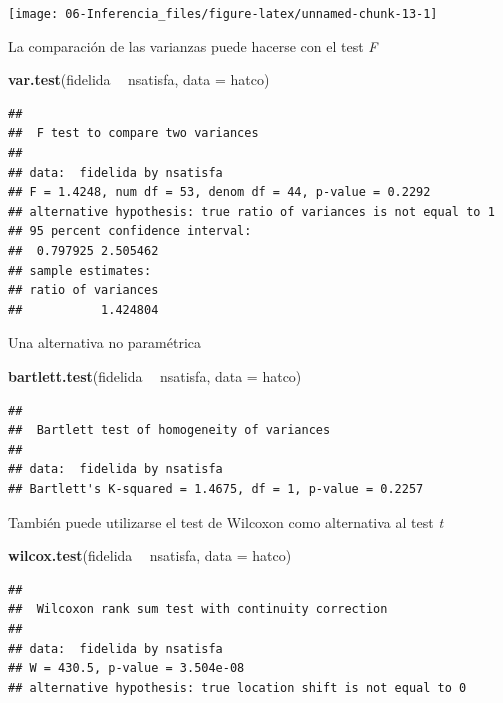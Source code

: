 \documentclass[]{book}
\newenvironment{Shaded}{\begin{snugshade}}{\end{snugshade}}
\newcommand{\DataTypeTok}[1]{\textcolor[rgb]{0.13,0.29,0.53}{#1}}
\newcommand{\KeywordTok}[1]{\textcolor[rgb]{0.13,0.29,0.53}{\textbf{#1}}}
\newcommand{\NormalTok}[1]{#1}
\newcommand{\OperatorTok}[1]{\textcolor[rgb]{0.81,0.36,0.00}{\textbf{#1}}}
\newcommand{\StringTok}[1]{\textcolor[rgb]{0.31,0.60,0.02}{#1}}
\begin{document}
\begin{center}\texttt{[image: 06-Inferencia\_files/figure-latex/unnamed-chunk-13-1]} \end{center}

La comparación de las varianzas puede hacerse con el test \emph{F}

\begin{Shaded}
\begin{Highlighting}[]
\KeywordTok{var.test}\NormalTok{(fidelida }\OperatorTok{~}\StringTok{ }\NormalTok{nsatisfa, }\DataTypeTok{data =}\NormalTok{ hatco)}
\end{Highlighting}
\end{Shaded}

\begin{verbatim}
## 
##  F test to compare two variances
## 
## data:  fidelida by nsatisfa
## F = 1.4248, num df = 53, denom df = 44, p-value = 0.2292
## alternative hypothesis: true ratio of variances is not equal to 1
## 95 percent confidence interval:
##  0.797925 2.505462
## sample estimates:
## ratio of variances 
##           1.424804
\end{verbatim}

Una alternativa no paramétrica

\begin{Shaded}
\begin{Highlighting}[]
\KeywordTok{bartlett.test}\NormalTok{(fidelida }\OperatorTok{~}\StringTok{ }\NormalTok{nsatisfa, }\DataTypeTok{data =}\NormalTok{ hatco)}
\end{Highlighting}
\end{Shaded}

\begin{verbatim}
## 
##  Bartlett test of homogeneity of variances
## 
## data:  fidelida by nsatisfa
## Bartlett's K-squared = 1.4675, df = 1, p-value = 0.2257
\end{verbatim}

También puede utilizarse el test de Wilcoxon como alternativa al test \emph{t}

\begin{Shaded}
\begin{Highlighting}[]
\KeywordTok{wilcox.test}\NormalTok{(fidelida }\OperatorTok{~}\StringTok{ }\NormalTok{nsatisfa, }\DataTypeTok{data =}\NormalTok{ hatco)}
\end{Highlighting}
\end{Shaded}

\begin{verbatim}
## 
##  Wilcoxon rank sum test with continuity correction
## 
## data:  fidelida by nsatisfa
## W = 430.5, p-value = 3.504e-08
## alternative hypothesis: true location shift is not equal to 0
\end{verbatim}
\end{document}

